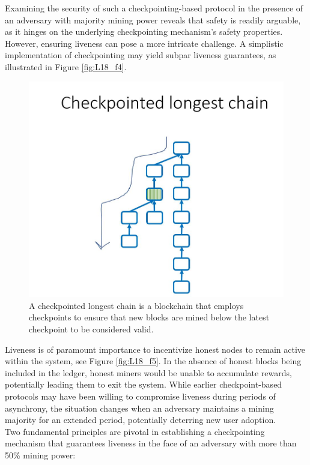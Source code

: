 Examining the security of such a checkpointing-based protocol in the presence of an adversary with majority mining power reveals that safety is readily arguable, as it hinges on the underlying checkpointing mechanism's safety properties. However, ensuring liveness can pose a more intricate challenge. A simplistic implementation of checkpointing may yield subpar liveness guarantees, as illustrated in Figure \ref{fig:L18_f4}.
\begin{center}
	\begin{figure}
		\centering
		\includegraphics[width=0.5\linewidth]{Fig/18/F3}
		\caption{A checkpointed longest chain is a blockchain that employs checkpoints to ensure that new blocks are mined below the latest checkpoint to be considered valid.}
		\label{fig:f3}
	\end{figure}
\end{center}
Liveness is of paramount importance to incentivize honest nodes to remain active within the system, see Figure \ref{fig:L18_f5}. In the absence of honest blocks being included in the ledger, honest miners would be unable to accumulate rewards, potentially leading them to exit the system. While earlier checkpoint-based protocols may have been willing to compromise liveness during periods of asynchrony, the situation changes when an adversary maintains a mining majority for an extended period, potentially deterring new user adoption.\\
Two fundamental principles are pivotal in establishing a checkpointing mechanism that guarantees liveness in the face of an adversary with more than 50\% mining power:
